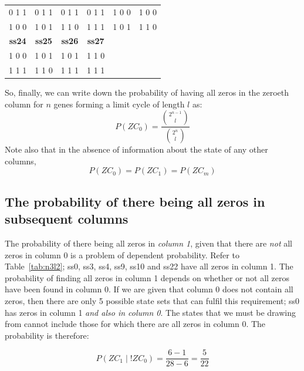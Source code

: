 \documentclass[11pt, a4paper]{article}
\begin{document}
\begin{table}[h!]
\begin{center}
\begin{tabular}{c|c|c|c|c|c}
      \hline
      0 1 1       & 0 1 1       & 0 1 1       & 0 1 1       & 1 0 0      & 1 0 0       \\
      1 0 0       & 1 0 1       & 1 1 0       & 1 1 1       & 1 0 1      & 1 1 0       \\
      \hline
      \textbf{ss24} & \textbf{ss25} & \textbf{ss26} & \textbf{ss27} &        &             \\
      \hline
      1 0 0       & 1 0 1       & 1 0 1       & 1 1 0       &            &             \\
      1 1 1       & 1 1 0       & 1 1 1       & 1 1 1       &            &             \\
      \hline
    \end{tabular}
  \end{center}
\end{table}

So, finally, we can write down the probability of having all zeros in
the zeroeth column for $n$ genes forming a limit cycle of length $l$ as:
\begin{equation}
P(ZC_0) = \frac{\binom{2^{n-1}}{l}}{\binom{2^n}{l}}
\end{equation}
Note also that in the absence of information about the state of any
other columns,
\begin{equation}
P(ZC_0) = P(ZC_1) = P(ZC_m)
\end{equation}

\subsection{The probability of there being all zeros in subsequent columns}

The probability of there being all zeros in
\emph{column 1}, given that there are \emph{not} all zeros in
column 0 is a problem of dependent probability. Refer to
Table~\ref{tab:n3l2}; ss0, ss3, ss4, ss9, ss10 and ss22 have all zeros
in column 1. The probability of finding all zeros in column 1 depends
on whether or not all zeros have been found in column 0. If we are
given that column 0 does not contain all zeros, then there are only 5
possible state sets that can fulfil this requirement; ss0 has zeros in
column 1 \emph{and also in column 0}. The states that we must be
drawing from cannot include those for which there are all zeros in
column 0. The probability is therefore:

\begin{equation}
P(ZC_1\;|\;!ZC_0) = \frac{6 -1}{28-6} = \frac{5}{22}
\end{equation}
\end{document}
